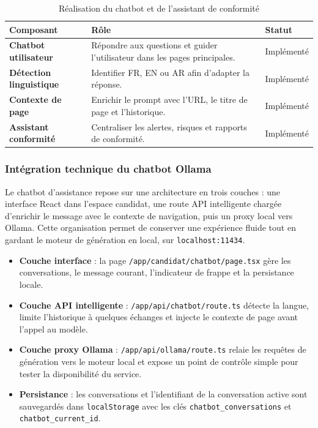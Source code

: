 \documentclass[12pt,a4paper]{report}
\newcommand{\tblhead}[1]{\cellcolor{darkblue}\color{white}\bfseries #1}
\newcommand{\tblleft}[1]{\bfseries\color{darkblue} #1}
\begin{document}
\renewcommand{\arraystretch}{1.25}
\begin{table}[H]
\centering
\begin{tabularx}{\textwidth}{|L{3.8cm}|Y|L{3cm}|}
\hline
\tblhead{Composant} & \tblhead{Rôle} & \tblhead{Statut} \\
\hline
\tblleft{Chatbot utilisateur} & Répondre aux questions et guider l'utilisateur dans les pages principales. & Implémenté \\
\hline
\tblleft{Détection linguistique} & Identifier FR, EN ou AR afin d'adapter la réponse. & Implémenté \\
\hline
\tblleft{Contexte de page} & Enrichir le prompt avec l'URL, le titre de page et l'historique. & Implémenté \\
\hline
\tblleft{Assistant conformité} & Centraliser les alertes, risques et rapports de conformité. & Implémenté \\
\hline
\end{tabularx}
\caption{Réalisation du chatbot et de l'assistant de conformité}
\label{tab:realisation-chatbot-conformite}
\end{table}
\renewcommand{\arraystretch}{1}

\subsubsection{Intégration technique du chatbot Ollama}

Le chatbot d'assistance repose sur une architecture en trois couches : une interface React dans l'espace candidat, une route API intelligente chargée d'enrichir le message avec le contexte de navigation, puis un proxy local vers Ollama. Cette organisation permet de conserver une expérience fluide tout en gardant le moteur de génération en local, sur \texttt{localhost:11434}.

\begin{itemize}
  \item \textbf{Couche interface} : la page \texttt{/app/candidat/chatbot/page.tsx} gère les conversations, le message courant, l'indicateur de frappe et la persistance locale.
  \item \textbf{Couche API intelligente} : \texttt{/app/api/chatbot/route.ts} détecte la langue, limite l'historique à quelques échanges et injecte le contexte de page avant l'appel au modèle.
  \item \textbf{Couche proxy Ollama} : \texttt{/app/api/ollama/route.ts} relaie les requêtes de génération vers le moteur local et expose un point de contrôle simple pour tester la disponibilité du service.
  \item \textbf{Persistance} : les conversations et l'identifiant de la conversation active sont sauvegardés dans \texttt{localStorage} avec les clés \texttt{chatbot\_conversations} et \texttt{chatbot\_current\_id}.
\end{itemize}
\end{document}
